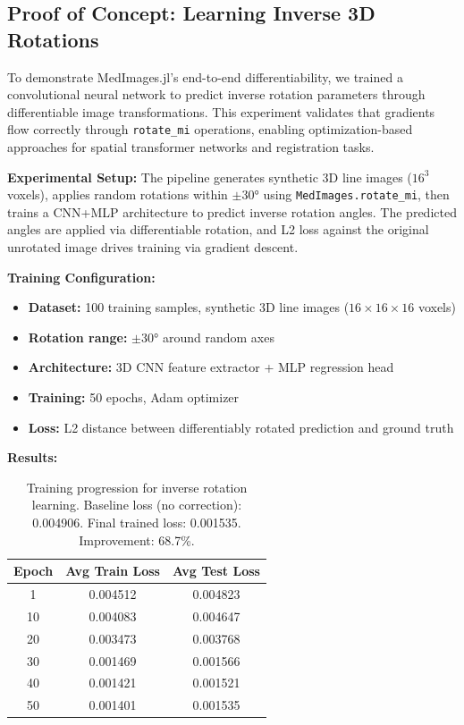 \documentclass[a4paper,10pt]{elsarticle}
\begin{document}
  \subsection{Proof of Concept: Learning Inverse 3D Rotations}

  To demonstrate MedImages.jl's end-to-end differentiability, we trained a convolutional neural network to predict inverse rotation parameters through differentiable image transformations. This experiment validates that gradients flow
  correctly through \texttt{rotate\_mi} operations, enabling optimization-based approaches for spatial transformer networks and registration tasks.

  \textbf{Experimental Setup:}
  The pipeline generates synthetic 3D line images ($16^3$ voxels), applies random rotations within $\pm30°$ using \texttt{MedImages.rotate\_mi}, then trains a CNN+MLP architecture to predict inverse rotation angles. The predicted angles
  are applied via differentiable rotation, and L2 loss against the original unrotated image drives training via gradient descent.

  \textbf{Training Configuration:}
  \begin{itemize}
      \item \textbf{Dataset:} 100 training samples, synthetic 3D line images ($16 \times 16 \times 16$ voxels)
      \item \textbf{Rotation range:} $\pm30°$ around random axes
      \item \textbf{Architecture:} 3D CNN feature extractor + MLP regression head
      \item \textbf{Training:} 50 epochs, Adam optimizer
      \item \textbf{Loss:} L2 distance between differentiably rotated prediction and ground truth
  \end{itemize}

  \textbf{Results:}

  \begin{table}[H]
  \centering
  \begin{tabular}{|c|c|c|}
  \hline
  \textbf{Epoch} & \textbf{Avg Train Loss} & \textbf{Avg Test Loss} \\
  \hline
  1 & 0.004512 & 0.004823 \\
  10 & 0.004083 & 0.004647 \\
  20 & 0.003473 & 0.003768 \\
  30 & 0.001469 & 0.001566 \\
  40 & 0.001421 & 0.001521 \\
  50 & 0.001401 & 0.001535 \\
  \hline
  \end{tabular}
  \caption{Training progression for inverse rotation learning. Baseline loss (no correction): 0.004906. Final trained loss: 0.001535. Improvement: 68.7\%.}
  \label{tab:rotation_learning}
  \end{table}
\end{document}
